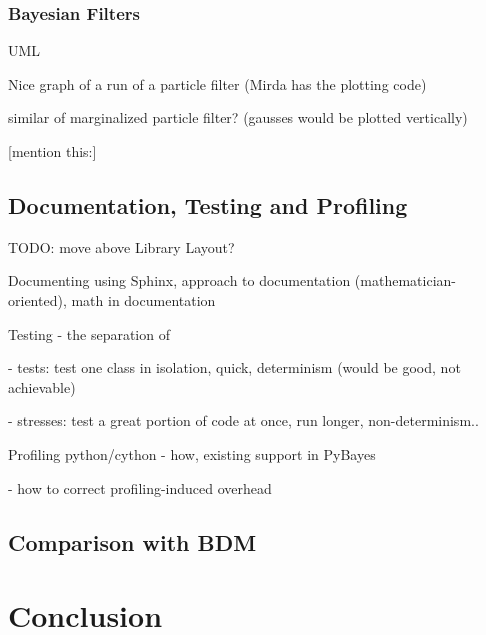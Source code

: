 \documentclass[a4paper,12pt,oneside]{report}
\newif\ifrelease %
\begin{document}
\subsection{Bayesian Filters}

UML

Nice graph of a run of a particle filter (Mirda has the plotting code)

similar of marginalized particle filter? (gausses would be plotted vertically)

[mention this:\cite{Smi:10}]

\section{Documentation, Testing and Profiling}

TODO: move above Library Layout?

Documenting using Sphinx, approach to documentation (mathematician-oriented), math in documentation

Testing - the separation of

- tests: test one class in isolation, quick, determinism (would be good, not achievable)

- stresses: test a great portion of code at once, run longer, non-determinism..

Profiling python/cython - how, existing support in PyBayes

- how to correct profiling-induced overhead

\section{Comparison with BDM}


\chapter*{Conclusion} 


\clearpage %



\ifrelease
	\appendix %
	\clearpage %
	\phantomsection %
	\addcontentsline{toc}{chapter}{\appendixname}

	\part*{\appendixname}

	
\fi
\end{document}
